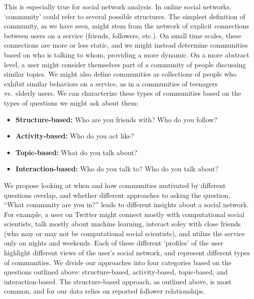 This is especially true for social network analysis. In online social networks, `community' could refer to several possible structures. The simplest definition of community, as we have seen, might stem from the network of explicit connections between users on a service (friends, followers, etc.). On small time scales, these connections are more or less static, and we might instead determine communities based on who is talking to whom, providing a more dynamic. On a more abstract level, a user might consider themselves part of a community of people discussing similar topics. We might also define communities as collections of people who exhibit similar behaviors on a service, as in a communities of teenagers vs.\ elderly users. We can characterize these types of communities based on the types of questions we might ask about them:
\begin{itemize}
	\item \textbf{Structure-based:} Who are you friends with? Who do you follow?
	\item \textbf{Activity-based:} Who do you act like?
	\item \textbf{Topic-based:} What do you talk about?
	\item \textbf{Interaction-based:} Who do you talk to? Who do you talk about?
\end{itemize}

We propose looking at when and how communities motivated by different questions overlap, and whether different approaches to asking the question, ``What community are you in?'' leads to different insights about a social network. For example, a user on Twitter might connect mostly with computational social scientists, talk mostly about machine learning, interact soley with close friends (who may or may not be computational social scientists), and utilize the service only on nights and weekends. Each of these different `profiles' of the user highlight different views of the user's social network, and represent different types of communities. We divide our approaches into four categories based on the questions outlined above: structure-based, activity-based, topic-based, and interaction-based. The structure-based approach, as outlined above, is most common, and for our data relies on reported follower relationships.

